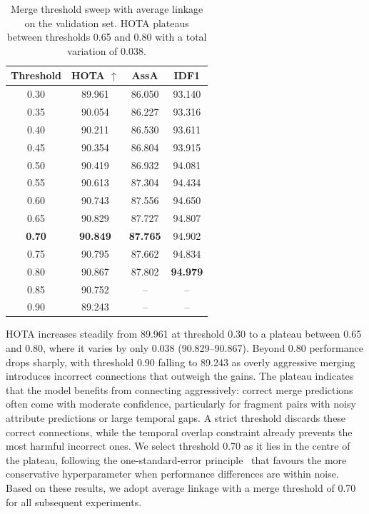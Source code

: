 \begin{table}[H]
\centering
\begin{tabular}{cccc}
\toprule
\textbf{Threshold} & \textbf{HOTA $\uparrow$} & \textbf{AssA} & \textbf{IDF1} \\
\midrule
0.30 & 89.961 & 86.050 & 93.140 \\
0.35 & 90.054 & 86.227 & 93.316 \\
0.40 & 90.211 & 86.530 & 93.611 \\
0.45 & 90.354 & 86.804 & 93.915 \\
0.50 & 90.419 & 86.932 & 94.081 \\
0.55 & 90.613 & 87.304 & 94.434 \\
0.60 & 90.743 & 87.556 & 94.650 \\
0.65 & 90.829 & 87.727 & 94.807 \\
\textbf{0.70} & \textbf{90.849} & \textbf{87.765} & 94.902 \\
0.75 & 90.795 & 87.662 & 94.834 \\
0.80 & 90.867 & 87.802 & \textbf{94.979} \\
0.85 & 90.752 & -- & -- \\
0.90 & 89.243 & -- & -- \\
\bottomrule
\end{tabular}
\caption{Merge threshold sweep with average linkage on the validation set. HOTA plateaus between thresholds 0.65 and 0.80 with a total variation of 0.038.}
\label{tab:clustering_sweep}
\end{table}

HOTA increases steadily from 89.961 at threshold 0.30 to a plateau between 0.65 and 0.80, where it varies by only 0.038 (90.829--90.867). Beyond 0.80 performance drops sharply, with threshold 0.90 falling to 89.243 as overly aggressive merging introduces incorrect connections that outweigh the gains. The plateau indicates that the model benefits from connecting aggressively: correct merge predictions often come with moderate confidence, particularly for fragment pairs with noisy attribute predictions or large temporal gaps. A strict threshold discards these correct connections, while the temporal overlap constraint already prevents the most harmful incorrect ones. We select threshold 0.70 as it lies in the centre of the plateau, following the one-standard-error principle~\cite{hastie2009elements} that favours the more conservative hyperparameter when performance differences are within noise. Based on these results, we adopt average linkage with a merge threshold of 0.70 for all subsequent experiments.
